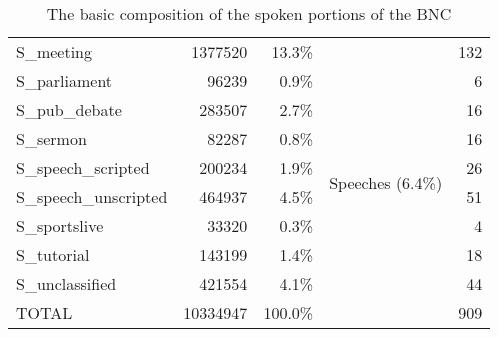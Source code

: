 \begin{table}[Ht]
\begin{tabular}{lrrcr}
        S\_meeting                  & 1377520  & 13.3\%  &                                     & 132   \\
        S\_parliament               & 96239    & 0.9\%   &                                     & 6     \\
        S\_pub\_debate              & 283507   & 2.7\%   &                                     & 16    \\
        S\_sermon                   & 82287    & 0.8\%   &                                     & 16    \\ \cline{4-4}
        S\_speech\_scripted         & 200234   & 1.9\%   & \multirow{2}{*}{Speeches (6.4\%)}   & 26    \\
        S\_speech\_unscripted       & 464937   & 4.5\%   &                                     & 51    \\ \cline{4-4}
        S\_sportslive               & 33320    & 0.3\%   &                                     & 4     \\
        S\_tutorial                 & 143199   & 1.4\%   &                                     & 18    \\
        S\_unclassified             & 421554   & 4.1\%   &                                     & 44    \\ \hline
        TOTAL                       & 10334947 & 100.0\% &                                     & 909   \\ \hline
    \end{tabular}

    \caption{The basic composition of the spoken portions of the BNC}
    \label{table:litreview:corpora:bncspokdist}
\end{table}

